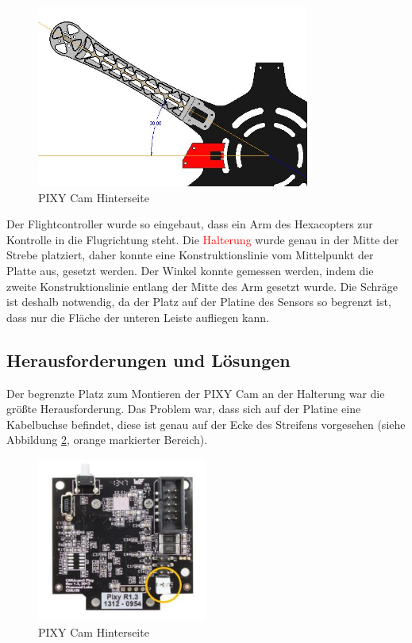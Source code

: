 			\begin{figure}[tbh]
			\begin{centering}
			\includegraphics[width = 0.8\textwidth]{Bilder/winkel_pixy}
			\par\end{centering}
			\caption[PIXY Cam Hinterseite]{PIXY Cam Hinterseite\cite{PIXY Cmu cam5}}
			\label{winkel_pixy}
			\end{figure}

	Der Flightcontroller wurde so eingebaut, dass ein Arm des Hexacopters zur Kontrolle in die Flugrichtung steht.
	Die \textcolor{red}{Halterung} wurde genau in der Mitte der Strebe platziert, daher konnte eine Konstruktionslinie vom Mittelpunkt der Platte aus, gesetzt werden.
	Der Winkel konnte gemessen werden, indem die zweite Konstruktionslinie entlang der Mitte des Arm gesetzt wurde.
	Die Schräge ist deshalb notwendig, da der Platz auf der Platine des Sensors so begrenzt ist, dass nur die Fläche der unteren Leiste aufliegen kann.

	\subsection{Herausforderungen und Lösungen}

	Der begrenzte Platz zum Montieren der PIXY Cam an der Halterung war die größte Herausforderung.
	Das  Problem war, dass sich auf der Platine eine Kabelbuchse befindet, diese ist genau auf der Ecke des Streifens vorgesehen (siehe Abbildung \ref{pixy_back}, orange markierter Bereich).

			\begin{figure}[tbh]
			\begin{centering}
			\includegraphics[width = 0.5\textwidth]{Bilder/pixy_back}
			\par\end{centering}
			\caption{PIXY Cam Hinterseite}
			\label{pixy_back}
			\end{figure}

